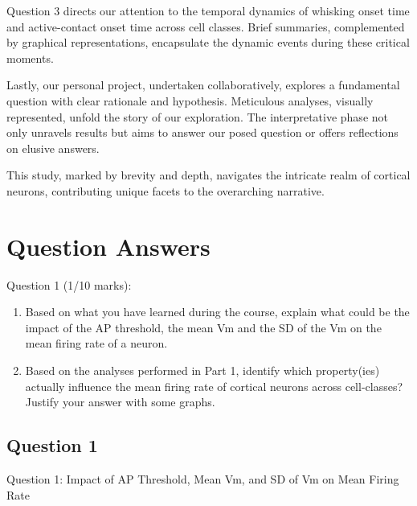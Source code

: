 \documentclass{IEEEtran}
\begin{document}
Question 3 directs our attention to the temporal dynamics of whisking onset time and active-contact onset time across cell classes. Brief summaries, complemented by graphical representations, encapsulate the dynamic events during these critical moments.

Lastly, our personal project, undertaken collaboratively, explores a fundamental question with clear rationale and hypothesis. Meticulous analyses, visually represented, unfold the story of our exploration. The interpretative phase not only unravels results but aims to answer our posed question or offers reflections on elusive answers.

This study, marked by brevity and depth, navigates the intricate realm of cortical neurons, contributing unique facets to the overarching narrative.


\section{Question Answers}

Question 1 (1/10 marks):
\begin{enumerate}
  \item Based on what you have learned during the course, explain what could be the impact of the AP threshold, the mean Vm and the SD of the Vm on the mean firing rate of a neuron. 
  \item 
  Based on the analyses performed in Part 1, identify which property(ies) actually influence the mean firing rate of cortical neurons across cell-classes? Justify your answer with some graphs.
\end{enumerate}

\subsection{Question 1}
Question 1: Impact of AP Threshold, Mean Vm, and SD of Vm on Mean Firing Rate



\end{document}
